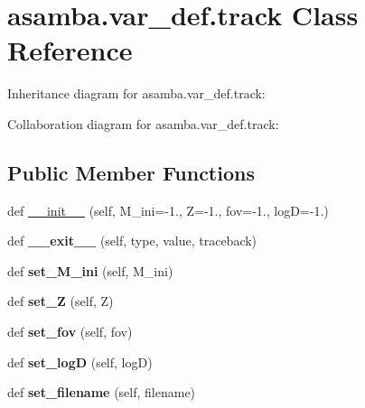 \hypertarget{classasamba_1_1var__def_1_1track}{}\section{asamba.\+var\+\_\+def.\+track Class Reference}
\label{classasamba_1_1var__def_1_1track}


Inheritance diagram for asamba.\+var\+\_\+def.\+track\+:


Collaboration diagram for asamba.\+var\+\_\+def.\+track\+:
\subsection*{Public Member Functions}
\begin{DoxyCompactItemize}
\item 
def \hyperlink{classasamba_1_1var__def_1_1track_a4b2441ffcfecbec92fb57d7d57aa3939}{\+\_\+\+\_\+init\+\_\+\+\_\+} (self, M\+\_\+ini=-\/1., Z=-\/1., fov=-\/1., logD=-\/1.)
\item 
\mbox{\label{classasamba_1_1var__def_1_1track_aed957132df7a7e728252aad31b93ea67}} 
def {\bfseries \+\_\+\+\_\+exit\+\_\+\+\_\+} (self, type, value, traceback)
\item 
\mbox{\label{classasamba_1_1var__def_1_1track_a5f46732cb3a31e15e2aed17688a403ea}} 
def {\bfseries set\+\_\+\+M\+\_\+ini} (self, M\+\_\+ini)
\item 
\mbox{\label{classasamba_1_1var__def_1_1track_ad70395a3e579d489e6234232629e341f}} 
def {\bfseries set\+\_\+Z} (self, Z)
\item 
\mbox{\label{classasamba_1_1var__def_1_1track_a26354c8dfd8dc3ee2cc1557ad1ab299d}} 
def {\bfseries set\+\_\+fov} (self, fov)
\item 
\mbox{\label{classasamba_1_1var__def_1_1track_a62f1ee4781b07e529f159ad292f199a9}} 
def {\bfseries set\+\_\+logD} (self, logD)
\item 
\mbox{\label{classasamba_1_1var__def_1_1track_aac1969da3c80cef07dac95d9d19a5267}} 
def {\bfseries set\+\_\+filename} (self, filename)

\end{DoxyCompactItemize}
